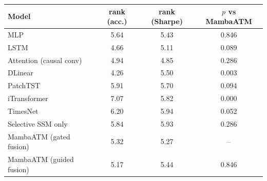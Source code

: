 {\footnotesize
\setlength{\tabcolsep}{3pt}
\begin{tabular}{lccc}
\toprule
\textbf{Model} & \textbf{rank (acc.)} & \textbf{rank (Sharpe)} & \textbf{$p$ vs MambaATM} \\
\midrule
MLP & 5.64 & 5.43 & 0.846 \\
LSTM & 4.66 & 5.11 & 0.089 \\
Attention (causal conv) & 4.94 & 4.85 & 0.286 \\
DLinear & 4.26 & 5.50 & 0.003 \\
PatchTST & 5.91 & 5.70 & 0.094 \\
iTransformer & 7.07 & 5.82 & 0.000 \\
TimesNet & 6.20 & 5.94 & 0.052 \\
Selective SSM only & 5.84 & 5.93 & 0.286 \\
MambaATM (gated fusion) & 5.32 & 5.27 & -- \\
MambaATM (guided fusion) & 5.17 & 5.44 & 0.846 \\
\bottomrule
\end{tabular}
}
